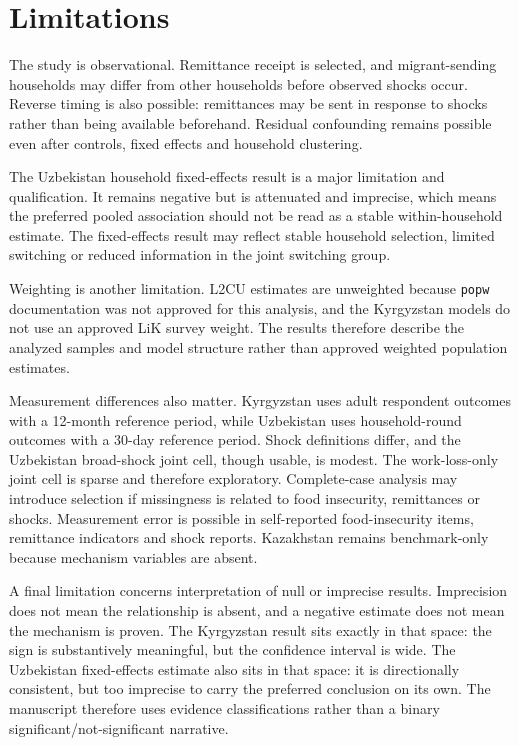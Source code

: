 \documentclass[11pt]{article}
\begin{document}
\section{Limitations}

The study is observational. Remittance receipt is selected, and migrant-sending households may differ from other households before observed shocks occur. Reverse timing is also possible: remittances may be sent in response to shocks rather than being available beforehand. Residual confounding remains possible even after controls, fixed effects and household clustering.

The Uzbekistan household fixed-effects result is a major limitation and qualification. It remains negative but is attenuated and imprecise, which means the preferred pooled association should not be read as a stable within-household estimate. The fixed-effects result may reflect stable household selection, limited switching or reduced information in the joint switching group.

Weighting is another limitation. L2CU estimates are unweighted because \texttt{popw} documentation was not approved for this analysis, and the Kyrgyzstan models do not use an approved LiK survey weight. The results therefore describe the analyzed samples and model structure rather than approved weighted population estimates.

Measurement differences also matter. Kyrgyzstan uses adult respondent outcomes with a 12-month reference period, while Uzbekistan uses household-round outcomes with a 30-day reference period. Shock definitions differ, and the Uzbekistan broad-shock joint cell, though usable, is modest. The work-loss-only joint cell is sparse and therefore exploratory. Complete-case analysis may introduce selection if missingness is related to food insecurity, remittances or shocks. Measurement error is possible in self-reported food-insecurity items, remittance indicators and shock reports. Kazakhstan remains benchmark-only because mechanism variables are absent.

A final limitation concerns interpretation of null or imprecise results. Imprecision does not mean the relationship is absent, and a negative estimate does not mean the mechanism is proven. The Kyrgyzstan result sits exactly in that space: the sign is substantively meaningful, but the confidence interval is wide. The Uzbekistan fixed-effects estimate also sits in that space: it is directionally consistent, but too imprecise to carry the preferred conclusion on its own. The manuscript therefore uses evidence classifications rather than a binary significant/not-significant narrative.
\end{document}
